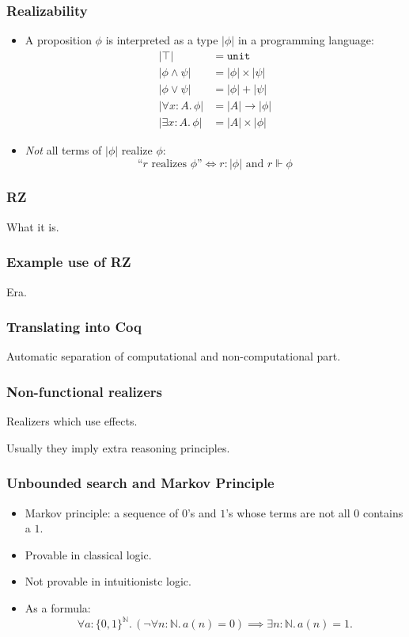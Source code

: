 \documentclass[t]{beamer}
\newcommand{\NN}{\mathbb{N}}
\begin{document}
\begin{frame}
  \frametitle{Realizability}

  \begin{itemize}
  \item A proposition $\phi$ is interpreted as a type $|\phi|$ in a
    programming language:
    \begin{align*}
      |\top| &= \mathtt{unit} \\
      |\phi \land \psi| &= |\phi| \times |\psi| \\
      |\phi \lor \psi| &= |\phi| + |\psi| \\
      |\forall x : A .\, \phi| &= |A| \to |\phi| \\
      |\exists x : A .\, \phi| &= |A| \times |\phi|
    \end{align*}
  \item \emph{Not} all terms of $|\phi|$ realize $\phi$:
    \begin{equation*}
      \text{``$r$ realizes $\phi$''} \iff \text{$r : |\phi|$ and $r \Vdash \phi$}
    \end{equation*}
  \end{itemize}
\end{frame}

\begin{frame}
  \frametitle{RZ}

  What it is.
\end{frame}

\begin{frame}
  \frametitle{Example use of RZ}

  Era.
\end{frame}

\begin{frame}
  \frametitle{Translating into Coq}

  Automatic separation of computational and non-computational part.
\end{frame}

\begin{frame}
  \frametitle{Non-functional realizers}

  Realizers which use effects.

  Usually they imply extra reasoning principles.
\end{frame}

\begin{frame}
  \frametitle{Unbounded search and Markov Principle}

  \begin{itemize}
  \item Markov principle: a sequence of $0$'s and $1$'s whose terms
    are not all $0$ contains a $1$.
  \item Provable in classical logic.
  \item Not provable in intuitionistc logic.
  \item As a formula:
    \begin{equation*}
      \forall a : \{0,1\}^\NN .\,
      (\lnot \forall n : \NN .\, a(n) = 0) \implies
      \exists n : \NN .\, a(n) = 1.
    \end{equation*}
  \end{itemize}
\end{frame}
\end{document}
